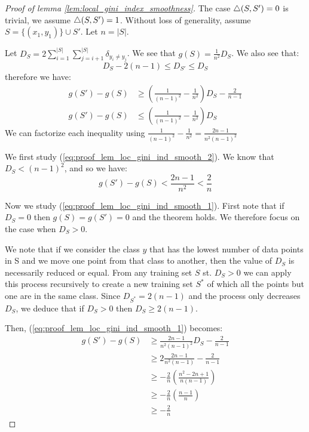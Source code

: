 \begin{proof}[Proof of lemma \ref{lem:local_gini_index_smoothness}]
    The case $\triangle(S, S') = 0$ is trivial, we assume $\triangle(S, S') = 1$. Without loss of generality, assume $S = \{(x_1, y_1)\} \cup S'$. Let $n = |S|$.
    
    Let $D_S = 2\sum_{i=1}^{|S|}\sum_{j=i+1}^{|S|} \delta_{y_i \neq y_j}$. We see that $g(S) = \frac{1}{n^2}D_S$. We also see that:
    \begin{equation*}
        D_S - 2(n-1) \leq D_{S'} \leq D_S
    \end{equation*}
    therefore we have:
    \begin{align}
        g(S') - g(S) &\geq \left(\frac{1}{(n-1)^2} - \frac{1}{n^2}\right)D_S - \frac{2}{n-1}\label{eq:proof_lem_loc_gini_ind_smooth_1}\\
        g(S') - g(S) &\leq \left(\frac{1}{(n-1)^2} - \frac{1}{n^2}\right)D_S\label{eq:proof_lem_loc_gini_ind_smooth_2}
    \end{align}
    We can factorize each inequality using $\frac{1}{(n-1)^2} - \frac{1}{n^2} = \frac{2n-1}{n^2(n-1)^2}$

    We first study (\ref{eq:proof_lem_loc_gini_ind_smooth_2}). We know that $D_S < (n-1)^2$, and so we have:
    \begin{equation*}
        g(S') - g(S) < \frac{2n-1}{n^2} < \frac{2}{n}
    \end{equation*}

    Now we study (\ref{eq:proof_lem_loc_gini_ind_smooth_1}). First note that if $D_S = 0$ then $g(S) = g(S') = 0$ and the theorem holds. We therefore focus on the case when $D_S > 0$.

    We note that if we consider the class $y$ that has the lowest number of data points in S and we move one point from that class to another, then the value of $D_S$ is necessarily reduced or equal. From any training set $S$ st. $D_S > 0$ we can apply this process recursively to create a new training set $S^*$ of which all the points but one are in the same class. Since $D_{S^*} = 2(n-1)$ and the process only decreases $D_S$, we deduce that if $D_S > 0$ then $D_S \geq 2(n-1)$.

    Then, (\ref{eq:proof_lem_loc_gini_ind_smooth_1}) becomes:
    \begin{equation*}
        \begin{split}
            g(S') - g(S) &\geq \frac{2n-1}{n^2(n-1)^2} D_S - \frac{2}{n-1}\\
            &\geq 2\frac{2n-1}{n^2(n-1)} - \frac{2}{n-1}\\
            &\geq -\frac{2}{n}\left(\frac{n^2 - 2n + 1}{n (n-1)}\right)\\
            &\geq -\frac{2}{n}\left(\frac{n-1}{n}\right)\\
            &\geq -\frac{2}{n}
        \end{split}
    \end{equation*}
\end{proof}

